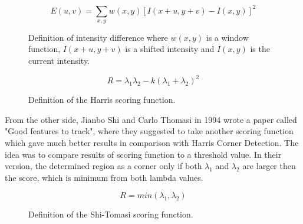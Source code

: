 \documentclass[../../../../main]{subfiles}
\begin{document}
\begin{figure} [!ht]
  \centering    
    \begin{equation}
        E(u,v) = \sum_{x,y} w(x,y) [I(x+u,y+v) - I(x,y)]^2
    \end{equation}
  \caption{Definition of intensity difference where $w(x,y)$ is a window function, $I(x+u,y+v)$ is a shifted intensity and $I(x,y)$ is the current intensity.}
\end{figure}

\begin{figure} [!ht]
  \centering    
    \begin{equation}
        R = \lambda_1\lambda_2 - k(\lambda_1+\lambda_2)^2
    \end{equation}
  \caption{Definition of the Harris scoring function.}
\end{figure}

From the other side, Jianbo Shi and Carlo Thomasi in 1994 wrote a paper called "Good features to track", where they suggested to take another scoring function which gave much better results in comparison with Harris Corner Detection. The idea was to compare results of scoring function to a threshold value. In their version, the determined region as a corner only if both $\lambda_1$ and $\lambda_2$ are larger then the score, which is minimum from both lambda values.

\begin{figure} [!ht]
  \centering    
    \begin{equation}
        R = min(\lambda_1,\lambda_2)
    \end{equation}
  \caption{Definition of the Shi-Tomasi scoring function.}
\end{figure}
\end{document}
